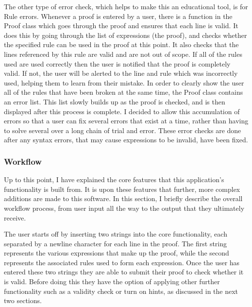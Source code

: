 The other type of error check, which helps to make this an educational tool, is for Rule errors. Whenever a proof is entered by a user, there is a function in the Proof class which goes through the proof and ensures that each line is valid. It does this by going through the list of expressions (the proof), and checks whether the specified rule can be used in the proof at this point. It also checks that the lines referenced by this rule are valid and are not out of scope. If all of the rules used are used correctly then the user is notified that the proof is completely valid. If not, the user will be alerted to the line and rule which was incorrectly used, helping them to learn from their mistake. In order to clearly show the user all of the rules that have been broken at the same time, the Proof class contains an error list. This list slowly builds up as the proof is checked, and is then displayed after this process is complete. I decided to allow this accumulation of errors so that a user can fix several errors that exist at a time, rather than having to solve several over a long chain of trial and error. These error checks are done after any syntax errors, that may cause expressions to be invalid, have been fixed.

\subsubsection{Workflow}
Up to this point, I have explained the core features that this application's functionality is built from. It is upon these features that further, more complex additions are made to this software. In this section, I briefly describe the overall workflow process, from user input all the way to the output that they ultimately receive.

The user starts off by inserting two strings into the core functionality, each separated by a newline character for each line in the proof. The first string represents the various expressions that make up the proof, while the second represents the associated rules used to form each expression. Once the user has entered these two strings they are able to submit their proof to check whether it is valid. Before doing this they have the option of applying other further functionality such as a validity check or turn on hints, as discussed in the next two sections.

